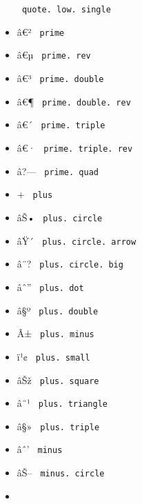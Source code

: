 \begin{itemize}
{  \texttt{\ quote.\ low.\ single\ }}
\item
  \label{symbol-prime}{{ â€² } \texttt{\ prime\ }}
\item
  \label{symbol-prime.rev}{{ â€µ }
  \texttt{\ prime.\ rev\ }}
\item
  \label{symbol-prime.double}{{ â€³ }
  \texttt{\ prime.\ double\ }}
\item
  \label{symbol-prime.double.rev}{{ â€¶ }
  \texttt{\ prime.\ double.\ rev\ }}
\item
  \label{symbol-prime.triple}{{ â€´ }
  \texttt{\ prime.\ triple\ }}
\item
  \label{symbol-prime.triple.rev}{{ â€· }
  \texttt{\ prime.\ triple.\ rev\ }}
\item
  \label{symbol-prime.quad}{{ â?--- }
  \texttt{\ prime.\ quad\ }}
\item
  \label{symbol-plus}{{ + } \texttt{\ plus\ }}
\item
  \label{symbol-plus.circle}{{ âŠ• }
  \texttt{\ plus.\ circle\ }}
\item
  \label{symbol-plus.circle.arrow}{{ âŸ´ }
  \texttt{\ plus.\ circle.\ arrow\ }}
\item
  \label{symbol-plus.circle.big}{{ â¨? }
  \texttt{\ plus.\ circle.\ big\ }}
\item
  \label{symbol-plus.dot}{{ âˆ'' }
  \texttt{\ plus.\ dot\ }}
\item
  \label{symbol-plus.double}{{ â§º }
  \texttt{\ plus.\ double\ }}
\item
  \label{symbol-plus.minus}{{ Â± }
  \texttt{\ plus.\ minus\ }}
\item
  \label{symbol-plus.small}{{ ï¹¢ }
  \texttt{\ plus.\ small\ }}
\item
  \label{symbol-plus.square}{{ âŠž }
  \texttt{\ plus.\ square\ }}
\item
  \label{symbol-plus.triangle}{{ â¨¹ }
  \texttt{\ plus.\ triangle\ }}
\item
  \label{symbol-plus.triple}{{ â§» }
  \texttt{\ plus.\ triple\ }}
\item
  \label{symbol-minus}{{ âˆ' } \texttt{\ minus\ }}
\item
  \label{symbol-minus.circle}{{ âŠ-- }
  \texttt{\ minus.\ circle\ }}
\item

\end{itemize}
